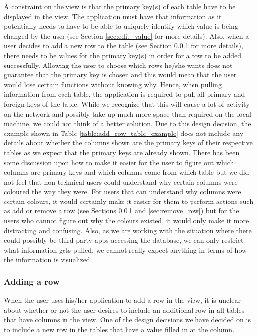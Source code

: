 \documentclass[12pt]{article}
\begin{document}
A constraint on the view is that the primary key(s) of each table have to be displayed in the view. The application must have that information as it potentially needs to have to be able to uniquely identify which value is being changed by the user (see Section \ref{sec:edit_value} for more details). Also, when a user decides to add a new row to the table (see Section \ref{sec:add_row} for more details), there needs to be values for the primary key(s) in order for a row to be added successfully. Allowing the user to choose which rows he/she wants does not guarantee that the primary key is chosen and this would mean that the user would lose certain functions without knowing why. Hence, when pulling information from each table, the application is required to pull all primary and foreign keys of the table. While we recognize that this will cause a lot of activity on the network and possibly take up much more space than required on the local machine, we could not think of a better solution. Due to this design decision, the example shown in Table \ref{table:add_row_table_example} does not include any details about whether the columns shown are the primary keys of their respective tables as we expect that the primary keys are already shown. There has been some discussion upon how to make it easier for the user to figure out which columns are primary keys and which columns come from which table but we did not feel that non-technical users could understand why certain columns were coloured the way they were. For users that can understand why columns were certain colours, it would certainly make it easier for them to perform actions such as add or remove a row (see Sections \ref{sec:add_row} and \ref{sec:remove_row}) but for the users who cannot figure out why the colours existed, it would only make it more distracting and confusing. Also, as we are working with the situation where there could possibly be third party apps accessing the database, we can only restrict what information gets pulled, we cannot really expect anything in terms of how the information is visualized.

\subsubsection{Adding a row}
\label{sec:add_row}
When the user uses his/her application to add a row in the view, it is unclear about whether or not the user desires to include an additional row in all tables that have columns in the view. One of the design decisions we have decided on is to include a new row in the tables that have a value filled in at the column. 
\end{document}
